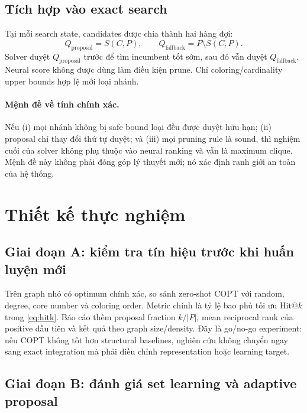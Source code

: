 \documentclass[11pt,a4paper]{article}
\makeatletter
\newcommand{\hitk}{\mathrm{Hit@}k}
\makeatother
\begin{document}
\subsection{Tích hợp vào exact search}

Tại mỗi search state, candidates được chia thành hai hàng đợi:
\begin{equation}
    Q_{\mathrm{proposal}}=S(C,P),\qquad
    Q_{\mathrm{fallback}}=P\setminus S(C,P).
\end{equation}
Solver duyệt $Q_{\mathrm{proposal}}$ trước để tìm incumbent tốt sớm, sau đó vẫn duyệt $Q_{\mathrm{fallback}}$. Neural score không được dùng làm điều kiện prune. Chỉ coloring/cardinality upper bounds hợp lệ mới loại nhánh.

\paragraph{Mệnh đề về tính chính xác.}
Nếu (i) mọi nhánh không bị safe bound loại đều được duyệt hữu hạn; (ii) proposal chỉ thay đổi thứ tự duyệt; và (iii) mọi pruning rule là sound, thì nghiệm cuối của solver không phụ thuộc vào neural ranking và vẫn là maximum clique. Mệnh đề này không phải đóng góp lý thuyết mới; nó xác định ranh giới an toàn của hệ thống.

\section{Thiết kế thực nghiệm}

\subsection{Giai đoạn A: kiểm tra tín hiệu trước khi huấn luyện mới}

Trên graph nhỏ có optimum chính xác, so sánh zero-shot COPT với random, degree, core number và coloring order. Metric chính là tỷ lệ bao phủ tối ưu $\hitk$ trong \cref{eq:hitk}. Báo cáo thêm proposal fraction $k/|P|$, mean reciprocal rank của positive đầu tiên và kết quả theo graph size/density. Đây là go/no-go experiment: nếu COPT không tốt hơn structural baselines, nghiên cứu không chuyển ngay sang exact integration mà phải điều chỉnh representation hoặc learning target.

\subsection{Giai đoạn B: đánh giá set learning và adaptive proposal}
\end{document}
